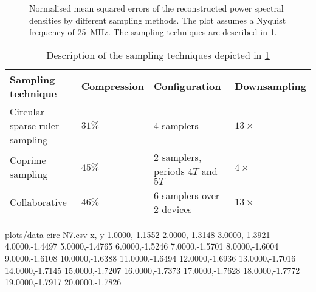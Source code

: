 \documentclass[a4paper, openany, oneside]{memoir}
\begin{document}
\begin{figure}
	\centering
	\caption{Normalised mean squared errors of the reconstructed power spectral densities by different sampling methods. The plot assumes a Nyquist frequency of \SI{25}{MHz}. The sampling techniques are described in \cref{tab:sampling-nmse}.}
	\label{fig:plot-nmse}
\end{figure}

\begin{table}
	\centering
	\begin{tabular}{llll}
		\textbf{Sampling technique} & \textbf{Compression} & \textbf{Configuration} & \textbf{Downsampling} \\ \hline
		Circular sparse ruler sampling & $31\%$ & $4$ samplers & $13 \times$ \\
		Coprime sampling & $45\%$ & $2$ samplers, periods $4T$ and $5T$ & $4 \times$ \\
		Collaborative & $46\%$ &$6$ samplers over $2$ devices & $13 \times$
	\end{tabular}
	\caption{Description of the sampling techniques depicted in \cref{fig:plot-nmse}}
	\label{tab:sampling-nmse}
\end{table}



\begin{filecontents*}{plots/data-circ-N7.csv}
x, y
1.0000,-1.1552
2.0000,-1.3148
3.0000,-1.3921
4.0000,-1.4497
5.0000,-1.4765
6.0000,-1.5246
7.0000,-1.5701
8.0000,-1.6004
9.0000,-1.6108
10.0000,-1.6388
11.0000,-1.6494
12.0000,-1.6936
13.0000,-1.7016
14.0000,-1.7145
15.0000,-1.7207
16.0000,-1.7373
17.0000,-1.7628
18.0000,-1.7772
19.0000,-1.7917
20.0000,-1.7826
\end{filecontents*}
\end{document}
